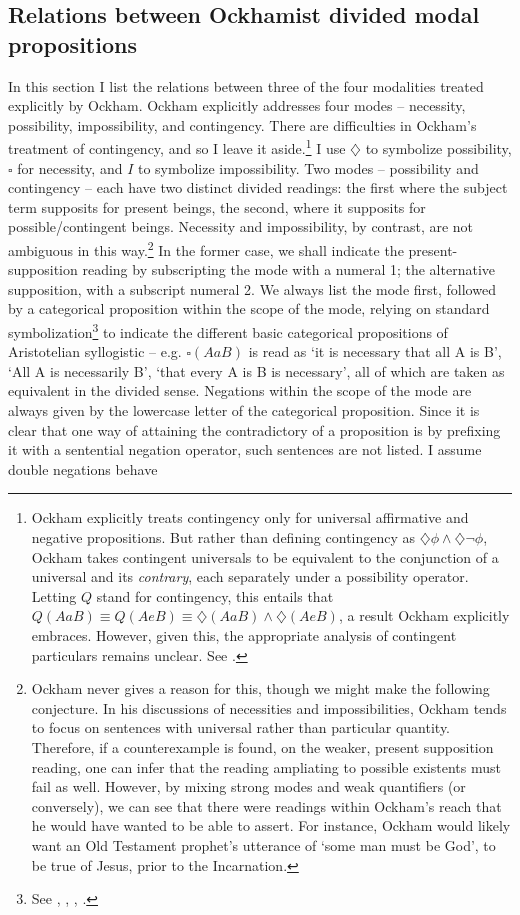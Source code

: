 	\subsection{Relations between Ockhamist divided modal propositions}
	In this section I list the relations between three of the four modalities treated explicitly by Ockham. Ockham explicitly addresses four modes – necessity, possibility, impossibility, and contingency. There are difficulties in Ockham's treatment of contingency, and so I leave it aside.\footnote{Ockham explicitly treats contingency only for universal affirmative and negative propositions. But rather than defining contingency as $\diamondsuit\phi \wedge \diamondsuit \neg \phi$, Ockham takes contingent universals to be equivalent to the conjunction of a universal and its \textit{contrary}, each separately under a possibility operator. Letting $Q$ stand for contingency, this entails that $Q(AaB) \equiv Q(AeB) \equiv \diamondsuit(AaB) \wedge \diamondsuit(AeB)$, a result Ockham explicitly embraces. However, given this, the appropriate analysis of contingent particulars remains unclear. See \cite[III-3. 15, pp. 647-648]{OckhamSL}.}  I use $\diamondsuit$  to symbolize possibility, $\square$ for necessity, and $I$ to symbolize impossibility. Two modes – possibility and contingency – each have two distinct divided readings: the first where the subject term supposits for present beings, the second, where it supposits for possible/contingent beings. Necessity and impossibility, by contrast, are not ambiguous in this way.\footnote{Ockham never gives a reason for this, though we might make the following conjecture. In his discussions of necessities and impossibilities, Ockham tends to focus on sentences with universal rather than particular quantity. Therefore, if a counterexample is found, on the weaker, present supposition reading, one can infer that the reading ampliating to possible existents must fail as well. However, by mixing strong modes and weak quantifiers (or conversely), we can see that there were readings within Ockham’s reach that he would have wanted to be able to assert. For instance, Ockham would likely want an Old Testament prophet’s utterance of `some man must be God', to be true of Jesus, prior to the Incarnation.}  In the former case, we shall indicate the present-supposition reading by subscripting the mode with a numeral 1; the alternative supposition, with a subscript numeral 2. We always list the mode first, followed by a categorical proposition within the scope of the mode, relying on standard symbolization\footnote{See \cite{Corcoran1972b}, \cite{AristotleSmith}, \cite{Uckelman2010b}, \cite{Johnston2015b}.} to indicate the different basic categorical propositions of Aristotelian syllogistic – e.g. $\square(AaB)$ is read as `it is necessary that all A is B', `All A is necessarily B', `that every A is B is necessary', all of which are taken as equivalent in the divided sense. Negations within the scope of the mode are always given by the lowercase letter of the categorical proposition. Since it is clear that one way of attaining the contradictory of a proposition is by prefixing it with a sentential negation operator, such sentences are not listed. I assume double negations behave 